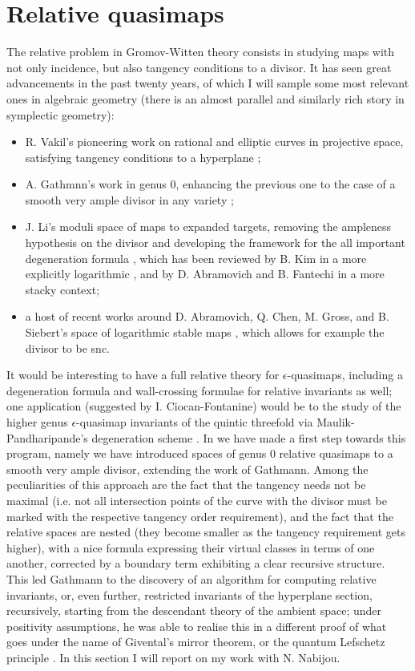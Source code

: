 \documentclass[11pt]{amsart}
\theoremstyle{definition}
\theoremstyle{definition}
\begin{document}
\section{Relative quasimaps}
The relative problem in Gromov-Witten theory consists in studying maps with not only incidence, but also tangency conditions to a divisor. It has seen great advancements in the past twenty years, of which I will sample some most relevant ones in algebraic geometry (there is an almost parallel and similarly rich story in symplectic geometry):
\begin{itemize}
 \item R. Vakil's pioneering work on rational and elliptic curves in projective space, satisfying tangency conditions to a hyperplane \cite{Vre};
 \item A. Gathmnn's work in genus $0$, enhancing the previous one to the case of a smooth very ample divisor in any variety \cite{Ga};
 \item J. Li's moduli space of maps to expanded targets, removing the ampleness hypothesis on the divisor and developing the framework for the all important degeneration formula \cite{Li1,Li2}, which has been reviewed by B. Kim in a more explicitly logarithmic \cite{KimLog}, and by D. Abramovich and B. Fantechi in a more stacky \cite{AbramovichFantechi} context;
 \item a host of recent works around D. Abramovich, Q. Chen, M. Gross, and B. Siebert's space of logarithmic stable maps \cite{ChenLog,AbramovichChenLog,GrossSiebertLog}, which allows for example the divisor to be snc.
\end{itemize}
It would be interesting to have a full relative theory for $\epsilon$-quasimaps, including a degeneration formula and wall-crossing formulae for relative invariants as well; one application (suggested by I. Ciocan-Fontanine) would be to the study of the higher genus $\epsilon$-quasimap invariants of the quintic threefold via Maulik-Pandharipande's degeneration scheme \cite{MauPan}. In \cite{BN} we have made a first step towards this program, namely we have introduced spaces of genus $0$ relative quasimaps to a smooth very ample divisor, extending the work of Gathmann. Among the peculiarities of this approach are the fact that the tangency needs not be maximal (i.e. not all intersection points of the curve with the divisor must be marked with the respective tangency order requirement), and the fact that the relative spaces are nested (they become smaller as the tangency requirement gets higher), with a nice formula expressing their virtual classes in terms of one another, corrected by a boundary term exhibiting a clear recursive structure. This led Gathmann to the discovery of an algorithm for computing relative invariants, or, even further, restricted invariants of the hyperplane section, recursively, starting from the descendant theory of the ambient space; under positivity assumptions, he was able to realise this in a different proof of what goes under the name of Givental's mirror theorem, or the quantum Lefschetz principle \cite{Ga-MF}. In this section I will report on my work with N. Nabijou.
\end{document}
